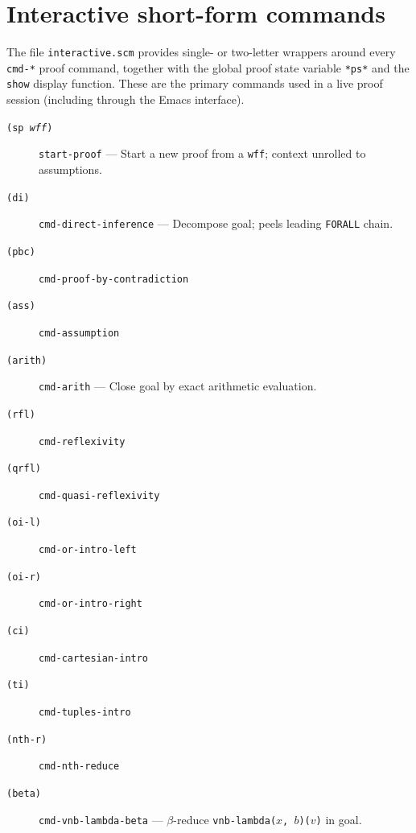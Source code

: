 \documentclass{amsbook}[openany]
\theoremstyle{definition}
\theoremstyle{remark}
\theoremstyle{remark}
\begin{document}
\section{Interactive short-form commands}
\label{sec:interactive}

The file \texttt{interactive.scm} provides single- or two-letter wrappers
around every \texttt{cmd-*} proof command, together with the global proof
state variable \texttt{*ps*} and the \texttt{show} display function.
These are the primary commands used in a live proof session (including
through the Emacs interface).

\begin{description}

\item[\texttt{(sp \textit{wff})}]
  \texttt{start-proof} --- Start a new proof from a \texttt{wff};
  context unrolled to assumptions.

\item[\texttt{(di)}]
  \texttt{cmd-direct-inference} --- Decompose goal; peels leading
  \texttt{FORALL} chain.

\item[\texttt{(pbc)}] \texttt{cmd-proof-by-contradiction}

\item[\texttt{(ass)}] \texttt{cmd-assumption}

\item[\texttt{(arith)}]
  \texttt{cmd-arith} --- Close goal by exact arithmetic evaluation.

\item[\texttt{(rfl)}] \texttt{cmd-reflexivity}

\item[\texttt{(qrfl)}] \texttt{cmd-quasi-reflexivity}

\item[\texttt{(oi-l)}] \texttt{cmd-or-intro-left}

\item[\texttt{(oi-r)}] \texttt{cmd-or-intro-right}

\item[\texttt{(ci)}] \texttt{cmd-cartesian-intro}

\item[\texttt{(ti)}] \texttt{cmd-tuples-intro}

\item[\texttt{(nth-r)}] \texttt{cmd-nth-reduce}

\item[\texttt{(beta)}]
  \texttt{cmd-vnb-lambda-beta} --- $\beta$-reduce
  \texttt{vnb-lambda($x$, $b$)($v$)} in goal.


\end{description}
\end{document}
